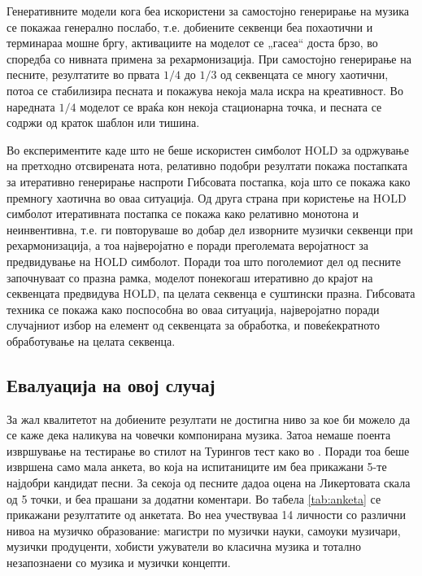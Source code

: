 Генеративните модели кога беа искористени за самостојно генерирање на музика се покажаа генерално послабо, т.е. добиените секвенци беа похаотични и терминараа мошне бргу, активациите на моделот се „гасеа“ доста брзо, во споредба со нивната примена за рехармонизација. При самостојно генерирање на песните, резултатите во првата $1/4$ до $1/3$ од секвенцата се многу хаотични, потоа се стабилизира песната и покажува некоја мала искра на креативност. Во наредната $1/4$ моделот се враќа кон некоја стационарна точка, и песната се содржи од краток шаблон или тишина.

Во експериментите каде што не беше искористен симболот HOLD за одржување на претходно отсвирената нота, релативно подобри резултати покажа постапката за итеративно генерирање наспроти Гибсовата постапка, која што се покажа како премногу хаотична во оваа ситуација. Од друга страна при користење на HOLD симболот итеративната постапка се покажа како релативно монотона и неинвентивна, т.е. ги повторуваше во добар дел изворните музички секвенци при рехармонизација, а тоа најверојатно е поради преголемата веројатност за предвидување на HOLD симболот. Поради тоа што поголемиот дел од песните започнуваат со празна рамка, моделот понекогаш итеративно до крајот на секвенцата предвидува HOLD, па целата секвенца е суштински празна. Гибсовата техника се покажа како поспособна во оваа ситуација, најверојатно поради случајниот избор на елемент од секвенцата за обработка, и повеќекратното обработување на целата секвенца. 

\subsection{Евалуација на овој случај}

За жал квалитетот на добиените резултати не достигна ниво за кое би можело да се каже дека наликува на човечки компонирана музика. Затоа немаше поента извршување на тестирање во стилот на Турингов тест како во \cite{Hadjeres2016,Liang2017,Yang2017}. Поради тоа беше извршена само мала анкета, во која на испитаниците им беа прикажани 5-те најдобри кандидат песни. За секоја од песните дадоа оцена на Ликертовата скала од 5 точки, и беа прашани за додатни коментари. Во табела \ref{tab:anketa} се прикажани резултатите од анкетата. Во неа учествуваа 14 личности со различни нивоа на музичко образование: магистри по музички науки, самоуки музичари, музички продуценти, хобисти ужуватели во класична музика и тотално незапознаени со музика и музички концепти. 

